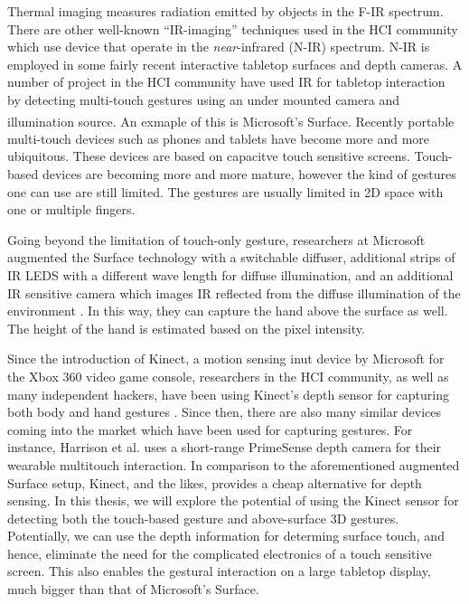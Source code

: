 Thermal imaging measures radiation emitted by objects in the F-IR spectrum.
There are other well-known ``IR-imaging'' techniques used in the HCI community
which use device that operate in the \textit{near}-infrared (N-IR) spectrum.
N-IR is employed in some fairly recent interactive tabletop surfaces and depth
cameras. A number of project in the HCI community have used IR for tabletop
interaction by detecting multi-touch gestures using an under mounted
camera and illumination source. An exmaple of this is Microsoft's 
Surface\textsuperscript{\textregistered}. Recently portable multi-touch devices
such as phones and tablets have become more and more ubiquitous. These devices
are based on capacitve touch sensitive screens. Touch-based devices are becoming
more and more mature, however the kind of gestures one can use are still
limited. The gestures are usually limited in 2D space with one or multiple
fingers. 

Going beyond the limitation of touch-only gesture, researchers at Microsoft
augmented the Surface technology with a switchable diffuser, additional
strips of IR LEDS with a different wave length for diffuse illumination, and an
additional IR sensitive camera which images IR reflected from the diffuse
illumination of the environment \cite{hilliges09}. In this way, they can capture
the hand above the surface as well. The height of the hand is estimated based on
the pixel intensity.

Since the introduction of Kinect, a motion sensing inut device by Microsoft for
the Xbox 360 video game console, researchers in the HCI community, as well as
many independent hackers, have been using Kinect's depth sensor for capturing
both body and hand gestures \cite{openni}. Since then, there are also many
similar devices coming into the market which have been used for capturing
gestures. For instance, Harrison et al. \cite{harrison11} uses  a short-range
PrimeSense \cite{primesense} depth camera for their wearable multitouch
interaction. In comparison to the aforementioned augmented Surface setup,
Kinect, and the likes, provides a cheap alternative for depth sensing. In this
thesis, we will explore the potential of using the Kinect sensor for detecting 
both the touch-based gesture and above-surface 3D gestures. Potentially, we can 
use the depth information for determing surface touch, and hence, eliminate the 
need for the complicated electronics of a touch sensitive screen. This also 
enables the gestural interaction on a large tabletop display, much bigger than 
that of Microsoft's Surface.

